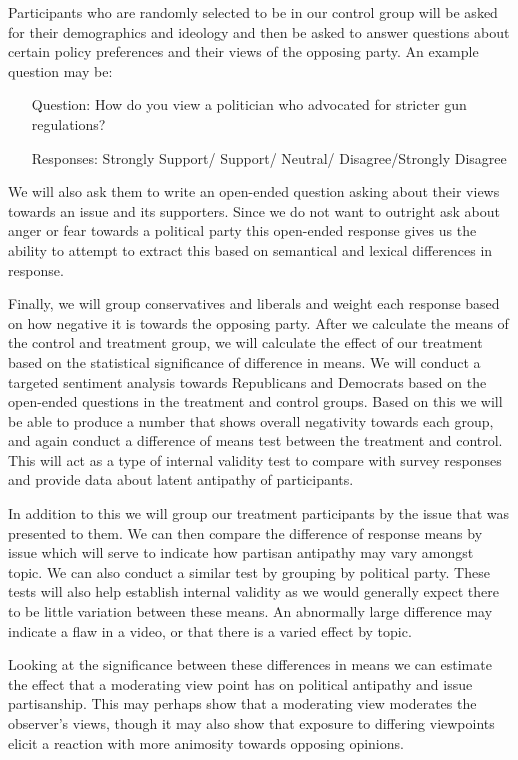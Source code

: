 \documentclass[12pt]{article}
\begin{document}
Participants who are randomly selected to be in our control group will be asked for their demographics and ideology and then be asked to answer questions about certain policy preferences and their views of the opposing party. An example question may be:

\begin{enumerate}[leftmargin=*]
	\item[Question:] How do you view a politician who advocated for stricter gun regulations?
	\item[Responses:] Strongly Support/ Support/ Neutral/ Disagree/Strongly Disagree 
\end{enumerate}

We will also ask them to write an open-ended question asking about their views towards an issue and its supporters. Since we do not want to outright ask about anger or fear towards a political party this open-ended response gives us the ability to attempt to extract this based on semantical and lexical differences in response. 

Finally, we will group conservatives and liberals and weight each response based on how negative it is towards the opposing party. After we calculate the means of the control and treatment group, we will calculate the effect of our treatment based on the statistical significance of difference in means. We will conduct a targeted sentiment analysis towards Republicans and Democrats based on the open-ended questions in the treatment and control groups. Based on this we will be able to produce a number that shows overall negativity towards each group, and again conduct a difference of means test between the treatment and control. This will act as a type of internal validity test to compare with survey responses and provide data about latent antipathy of participants. 

In addition to this we will group our treatment participants by the issue that was presented to them. We can then compare the difference of response means by issue which will serve to indicate how partisan antipathy may vary amongst topic. We can also conduct a similar test by grouping by political party. These tests will also help establish internal validity as we would generally expect there to be little variation between these means. An abnormally large difference may indicate a flaw in a video, or that there is a varied effect by topic.  

Looking at the significance between these differences in means we can estimate the effect that a moderating view point has on political antipathy and issue partisanship. This may perhaps show that a moderating view moderates the observer’s views, though it may also show that exposure to differing viewpoints elicit a reaction with more animosity towards opposing opinions. 
\end{document}
